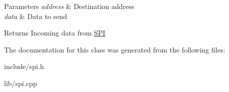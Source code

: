 \begin{DoxyParams}{Parameters}
{\em address} & Destination address \\
\hline
{\em data} & Data to send \\
\hline
\end{DoxyParams}
\begin{DoxyReturn}{Returns}
Incoming data from \hyperlink{class_s_p_i}{S\-P\-I} 
\end{DoxyReturn}


The documentation for this class was generated from the following files\-:\begin{DoxyCompactItemize}
\item 
include/spi.\-h\item 
lib/spi.\-cpp\end{DoxyCompactItemize}
